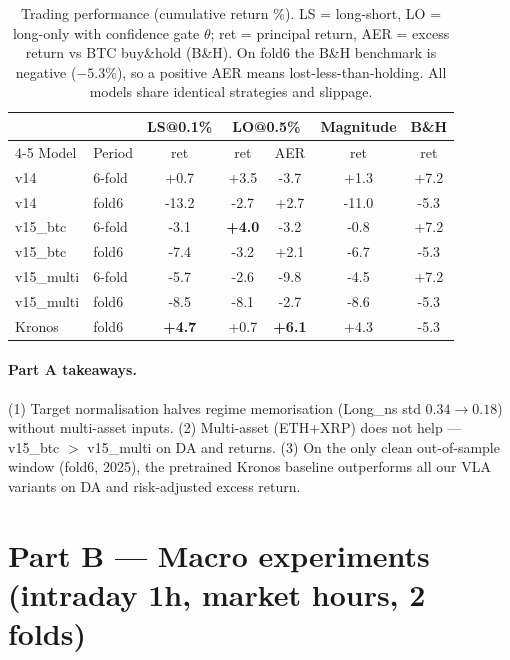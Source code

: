 \documentclass[11pt]{article}
\newcommand{\bb}[1]{\textcolor{best}{\textbf{#1}}}
\begin{document}
\begin{table}[h]\centering
\caption{Trading performance (cumulative return \%). LS = long-short, LO =
long-only with confidence gate $\theta$; ret = principal return, AER = excess
return vs BTC buy\&hold (B\&H). On fold6 the B\&H benchmark is negative
($-5.3\%$), so a positive AER means lost-less-than-holding. All models share
identical strategies and slippage.}
\label{tab:strat}
\begin{tabular}{llccccc}
\toprule
 & & LS@0.1\% & \multicolumn{2}{c}{LO@0.5\%} & Magnitude & B\&H \\
\cmidrule(lr){4-5}
Model & Period & ret & ret & AER & ret & ret \\
\midrule
v14        & 6-fold & +0.7  & +3.5 & -3.7 & +1.3  & +7.2 \\
v14        & fold6  & -13.2 & -2.7 & +2.7 & -11.0 & -5.3 \\
\midrule
v15\_btc   & 6-fold & -3.1  & \bb{+4.0} & -3.2 & -0.8  & +7.2 \\
v15\_btc   & fold6  & -7.4  & -3.2 & +2.1 & -6.7  & -5.3 \\
\midrule
v15\_multi & 6-fold & -5.7  & -2.6 & -9.8 & -4.5  & +7.2 \\
v15\_multi & fold6  & -8.5  & -8.1 & -2.7 & -8.6  & -5.3 \\
\midrule
Kronos     & fold6  & \bb{+4.7} & +0.7 & \bb{+6.1} & +4.3 & -5.3 \\
\bottomrule
\end{tabular}
\end{table}

\paragraph{Part A takeaways.}
(1) Target normalisation halves regime memorisation (Long\_ns std
$0.34\!\to\!0.18$) without multi-asset inputs.
(2) Multi-asset (ETH+XRP) does not help --- v15\_btc $>$ v15\_multi on DA and
returns.
(3) On the only clean out-of-sample window (fold6, 2025), the pretrained Kronos
baseline outperforms all our VLA variants on DA and risk-adjusted excess return.

\section*{Part B --- Macro experiments (intraday 1h, market hours, 2 folds)}
\end{document}
